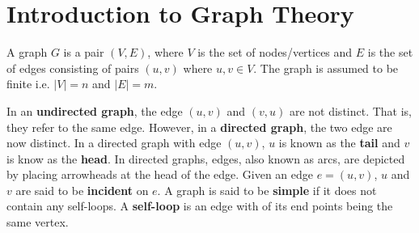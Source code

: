 
\chapter{Introduction to Graph Theory} %

\label{AppendixB} %

\begin{definition}[Graph]\label{def_graph}
	A graph $G$ is a pair $(V,E)$, where $V$ is the set of nodes/vertices and $E$ is the set of edges consisting of pairs $(u,v)$ where $u,v \in V$. The graph is assumed to be finite i.e. $|V| = n$ and $|E| = m$.
	
	In an \textbf{undirected graph}, the edge $(u,v)$ and $(v,u)$ are not distinct. That is, they refer to the same edge. However, in a \textbf{directed graph}, the two edge are now distinct. In a directed graph with edge $(u,v)$, $u$ is known as the \textbf{tail} and $v$ is know as the \textbf{head}. In directed graphs, edges, also known as arcs, are depicted by placing arrowheads at the head of the edge. Given an edge $e = (u,v)$, $u$ and $v$ are said to be \textbf{incident} on $e$. A graph is said to be \textbf{simple} if it does not contain any self-loops. A \textbf{self-loop} is an edge with of its end points being the same vertex.
\end{definition}


